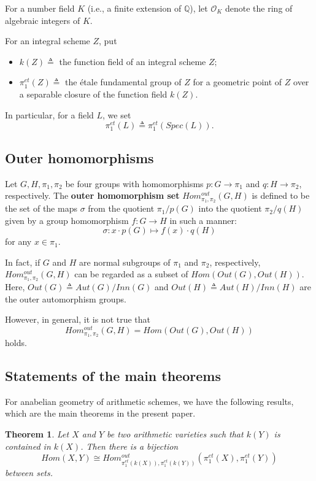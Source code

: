 \documentclass[12pt,twoside,reqno]{amsart}
\newtheorem{theorem}{Theorem}[section]
\theoremstyle{definition}
\numberwithin{equation}{section}
\begin{document}
For a number field $K$ (i.e., a finite extension of $\mathbb{Q}$), let
$\mathcal{O}_{K}$ denote the ring of algebraic integers of $K$.

For an integral scheme $Z$, put
\begin{itemize}
\item $k(Z)\triangleq$ the function field of an integral
scheme $Z;$

\item $\pi _{1}^{et}\left( Z\right) \triangleq$ the \'{e}tale
fundamental group of $Z$ for a geometric point of $Z$ over a
separable closure of the function field $k\left( Z\right).$
\end{itemize}

In particular, for a field $L$, we set $$\pi _{1}^{et}(L)\triangleq\pi _{1}^{et}(Spec(L)).$$

\subsection{Outer homomorphisms}

Let $G,H,\pi_{1},\pi_{2}$ be four groups with homomorphisms $p:G\to \pi_{1}$ and $q:H\to \pi_{2}$, respectively. The \textbf{outer homomorphism set} $Hom_{\pi_{1},\pi_{2}}^{out}(G,H)$ is defined to be the set of the maps $\sigma$ from the quotient $\pi_{1}/p(G)$ into the quotient $\pi_{2}/q(H)$ given by a group homomorphism $f:G\to H$ in such a manner: $$\sigma: x\cdot p(G)\mapsto f(x)\cdot q(H)$$ for any $x\in \pi_{1}$.

In fact, if $G$ and $H$ are normal subgroups of $\pi_{1}$ and $\pi_{2}$, respectively,  $Hom_{\pi_{1},\pi_{2}}^{out}(G,H)$ can be regarded as a subset of $Hom(Out(G),Out(H))$.
Here, $Out(G)\triangleq Aut(G)/Inn(G)$ and $Out(H) \triangleq Aut(H)/Inn(H)$ are the outer automorphism groups.

However, in general, it is not true that $$Hom_{\pi_{1},\pi_{2}}^{out}(G,H)= Hom(Out(G),Out(H))$$ holds.

\subsection{Statements of the main theorems}

For anabelian geometry of arithmetic schemes, we have the following results, which are the main theorems in the present paper.

\begin{theorem}
Let $X$ and $Y$ be two arithmetic varieties such that $k\left( Y\right) $ is contained in $ k\left( X\right)$. Then there is a bijection
\begin{equation*}
Hom\left( X,Y\right) \cong Hom_{\pi _{1}^{et}(k(X)),\pi _{1}^{et}(k(Y))
}^{out}\left( \pi _{1}^{et}\left( X\right) ,\pi _{1}^{et}\left( Y\right)
\right)
\end{equation*}
between sets.
\end{theorem}
\end{document}
